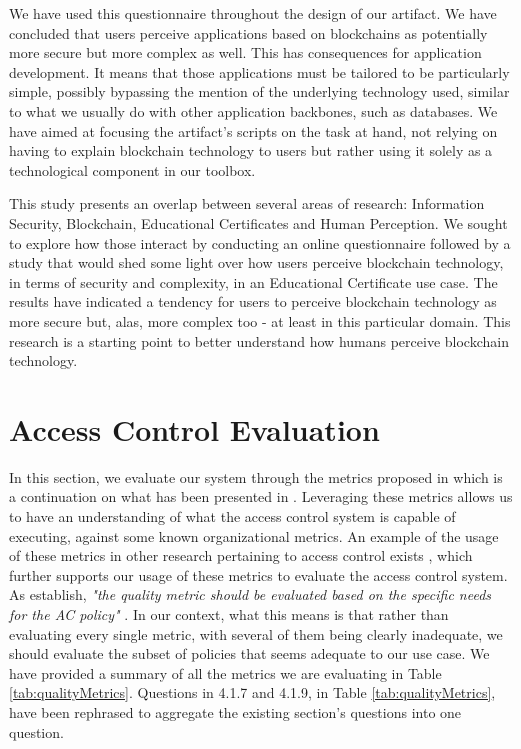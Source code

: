 We have used this questionnaire throughout the design of our artifact. We have concluded that users perceive applications based on blockchains as potentially more secure but more complex as well. This has consequences for application development. It means that those applications must be tailored to be particularly simple, possibly bypassing the mention of the underlying technology used, similar to what we usually do with other application backbones, such as databases. We have aimed at focusing the artifact's scripts on the task at hand, not relying on having to explain blockchain technology to users but rather using it solely as a technological component in our toolbox.

This study presents an overlap between several areas of research: Information Security, Blockchain, Educational Certificates and Human Perception. We sought to explore how those interact by conducting an online questionnaire followed by a study that would shed some light over how users perceive blockchain technology, in terms of security and complexity, in an Educational Certificate use case. The results have indicated a tendency for users to perceive blockchain technology as more secure but, alas, more complex too - at least in this particular domain. This research is a starting point to better understand how humans perceive blockchain technology.

\section{Access Control Evaluation}
\label{sec:eval-ac}

In this section, we evaluate our system through the metrics proposed in \cite{hu_guidelines_2012} which is a continuation on what has been presented in \cite{hu_assessment_2006}. Leveraging these metrics allows us to have an understanding of what the access control system is capable of executing, against some known organizational metrics. An example of the usage of these metrics in other research pertaining to access control exists \cite{LE2014184}, which further supports our usage of these metrics to evaluate the access control system. As \citeauthor{hu_guidelines_2012} \cite{hu_guidelines_2012} establish, \emph{"the quality metric should be evaluated based on the specific needs for the AC policy"} \cite[25]{hu_guidelines_2012}. In our context, what this means is that rather than evaluating every single metric, with several of them being clearly inadequate, we should evaluate the subset of policies that seems adequate to our use case. We have provided a summary of all the metrics we are evaluating in Table \ref{tab:qualityMetrics}. Questions in 4.1.7 and 4.1.9, in Table \ref{tab:qualityMetrics}, have been rephrased to aggregate the existing section's questions into one question.

